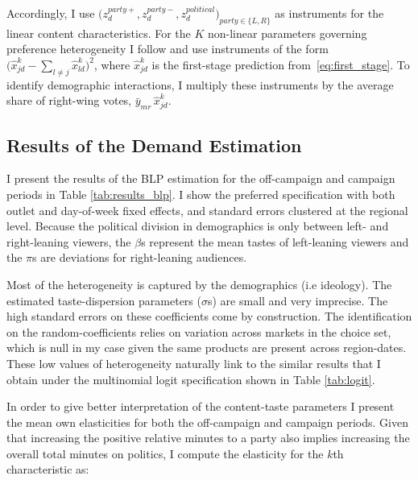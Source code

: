 \documentclass[12pt]{article}
\begin{document}
	
		
	
	Accordingly, I use
	$\bigl(z_d^{party+},z_d^{party-},z_d^{political}\bigr)_{party\in\{L,R\}}$
	as instruments for the linear content characteristics.  For the $K$ non-linear parameters governing preference heterogeneity I follow \citet{gandhi2019measuring} and use instruments of the form 
	$\bigl(\hat{x}_{jd}^k-\sum_{l\neq j}\hat{x}_{ld}^k\bigr)^2$,
	where $\hat{x}_{jd}^k$ is the first-stage prediction from~\eqref{eq:first_stage}.
	To identify demographic interactions, I multiply these instruments by the average share of right-wing votes, $\bar y_{mr}\,\hat{x}_{jd}^k$.



	\subsection{Results of the Demand Estimation}
	
	\label{sec:results}
	
	
I present the results of the BLP estimation for the off-campaign and campaign periods in Table \ref{tab:results_blp}. I show the preferred specification with both outlet and day-of-week fixed effects, and standard errors clustered at the regional level. Because the political division in demographics is only between left- and right-leaning viewers, the \(\beta\)s represent the mean tastes of left-leaning viewers and the \(\pi\)s are deviations for right-leaning audiences.


Most of the heterogeneity is captured by the demographics (i.e ideology).  The estimated taste-dispersion parameters (\(\sigma\)s) are small and very imprecise. The high standard errors on these coefficients come by construction. The identification on the random-coefficients relies on variation across markets in the choice set, which is null in my case given the same products are present across region-dates. These low values of heterogeneity naturally link to the similar results that I obtain under the multinomial logit specification shown in Table \ref{tab:logit}. 
 
  In order to give better interpretation of the content-taste parameters I present the mean own elasticities for both the off-campaign and campaign periods.   Given that increasing the positive relative minutes to a party also implies increasing the overall total minutes on politics, I compute the elasticity for the $k$th characteristic as: 
\end{document}
